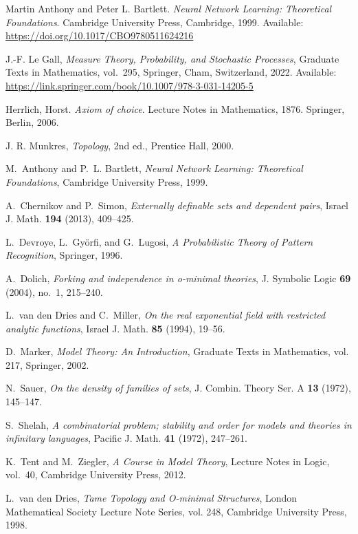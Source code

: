 \begin{thebibliography}{999}
    Martin Anthony and Peter L. Bartlett.
    \textit{Neural Network Learning: Theoretical Foundations}.
    Cambridge University Press, Cambridge, 1999.
    Available: \url{https://doi.org/10.1017/CBO9780511624216}

    J.-F. Le Gall,
    \textit{Measure Theory, Probability, and Stochastic Processes},
    Graduate Texts in Mathematics, vol.~295,
    Springer, Cham, Switzerland, 2022.
    Available: \url{https://link.springer.com/book/10.1007/978-3-031-14205-5}

    Herrlich, Horst.
    \textit{Axiom of choice}.
    Lecture Notes in Mathematics, 1876.
    Springer, Berlin, 2006.



    J. R. Munkres, \textit{Topology}, 2nd ed., Prentice Hall, 2000.


    M.~Anthony and P.~L. Bartlett, \emph{Neural Network Learning: Theoretical
    Foundations}, Cambridge University Press, 1999.

    A.~Chernikov and P.~Simon, \emph{Externally definable sets and dependent
    pairs}, Israel J. Math. \textbf{194} (2013), 409--425.

    L.~Devroye, L.~Györfi, and G.~Lugosi, \emph{A Probabilistic Theory of Pattern
    Recognition}, Springer, 1996.

    A.~Dolich, \emph{Forking and independence in o-minimal theories}, J. Symbolic
    Logic \textbf{69} (2004), no.~1, 215--240.

    L.~van den Dries and C.~Miller, \emph{On the real exponential field with
    restricted analytic functions}, Israel J. Math. \textbf{85} (1994), 19--56.

    D.~Marker, \emph{Model Theory: An Introduction}, Graduate Texts in Mathematics,
    vol. 217, Springer, 2002.

    N.~Sauer, \emph{On the density of families of sets}, J. Combin. Theory Ser. A
    \textbf{13} (1972), 145--147.

    S.~Shelah, \emph{A combinatorial problem; stability and order for models and
    theories in infinitary languages}, Pacific J. Math. \textbf{41} (1972),
    247--261.

    K.~Tent and M.~Ziegler, \emph{A Course in Model Theory}, Lecture Notes in
    Logic, vol.~40, Cambridge University Press, 2012.

    L.~van den Dries, \emph{Tame Topology and O-minimal Structures}, London
    Mathematical Society Lecture Note Series, vol. 248, Cambridge University
    Press, 1998.



\end{thebibliography}